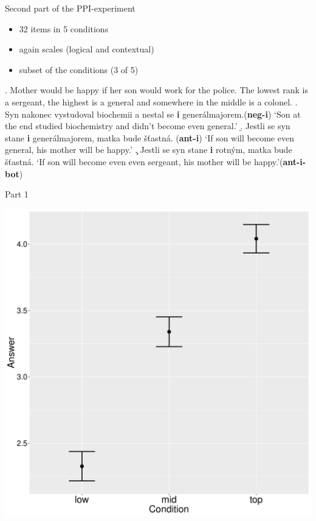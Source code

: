 \documentclass[ignorenonframetext,]{beamer}
\providecommand{\tightlist}{%
  \setlength{\itemsep}{0pt}\setlength{\parskip}{0pt}}
\newcommand{\cond}[1]{\textbf{#1}}
\begin{document}
\begin{frame}{Second part of the PPI-experiment}

\begin{itemize}
\tightlist
\item
  32 items in 5 conditions
\item
  again scales (logical and contextual)
\item
  subset of the conditions (3 of 5)
\end{itemize}

\end{frame}

\begin{frame}

\ex. Mother would be happy if her son would work for the police. The
lowest rank is a sergeant, the highest is a general and somewhere in the
middle is a colonel.\label{ex-2} \a. Syn nakonec vystudoval biochemii a
nestal se \textbf{i}
generálmajorem.\hfill (\cond{neg-i})\label{ex-2-d}\newline
`Son at the end studied biochemistry and didn't become even general.'
\b. Jestli se syn stane \textbf{i} generálmajorem, matka bude šťastná.
\hfill (\cond{ant-i})\label{ex-2-e}\newline
`If son will become even general, his mother will be happy.' \c. Jestli
se syn stane \textbf{i} rotným, matka bude šťastná. \newline
`If son will become even even sergeant, his mother will be
happy.'\hfill (\cond{ant-i-bot})

\end{frame}


\begin{frame}{Part 1}

\begin{center}
\includegraphics[scale=0.3]{exp1-part_1-errorbars.pdf}
\end{center}

\end{frame}
\end{document}
